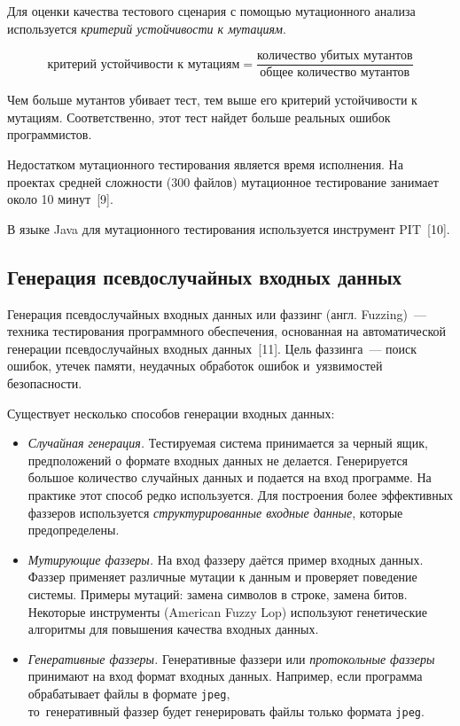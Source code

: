 Для оценки качества тестового сценария с помощью мутационного анализа используется \textit{критерий устойчивости к мутациям}.

\[ \text{критерий устойчивости к мутациям} = \frac{\text{количество убитых мутантов}}{\text{общее количество мутантов}}  \]

Чем больше мутантов убивает тест, тем выше его критерий устойчивости к мутациям. Соответственно, этот тест найдет больше реальных ошибок программистов. 

Недостатком мутационного тестирования является время исполнения. На проектах средней сложности (300 файлов) мутационное тестирование занимает около 10 минут~[9].

В языке Java для мутационного тестирования используется инструмент PIT~[10].

\subsection{Генерация псевдослучайных входных данных} 
 
Генерация псевдослучайных входных данных или фаззинг (англ. Fuzzing)~--- техника тестирования программного обеспечения, основанная на автоматической генерации псевдослучайных входных данных~[11]. Цель фаззинга~--- поиск ошибок, утечек памяти, неудачных обработок ошибок и~уязвимостей безопасности.

Существует несколько способов генерации входных данных:

\begin{itemize}
	\item \textit{Случайная генерация.} Тестируемая система принимается за черный ящик, предположений о формате входных данных не делается. Генерируется большое количество случайных данных и подается на вход программе. На практике этот способ редко используется. Для построения более эффективных фаззеров используется \textit{структурированные входные данные}, которые предопределены.
	\item \textit{Мутирующие фаззеры.} На вход фаззеру даётся пример входных данных. Фаззер применяет различные мутации к данным и проверяет поведение системы. Примеры мутаций: замена символов в строке, замена битов. Некоторые инструменты (American Fuzzy Lop) используют генетические алгоритмы для повышения качества входных данных.
	\item \textit{Генеративные фаззеры.} Генеративные фаззери или \textit{протокольные фаззеры} принимают на вход формат входных данных. Например, если программа обрабатывает файлы в формате \texttt{jpeg}, \\ то~генеративный фаззер будет генерировать файлы только формата \texttt{jpeg}.
\end{itemize}
 

